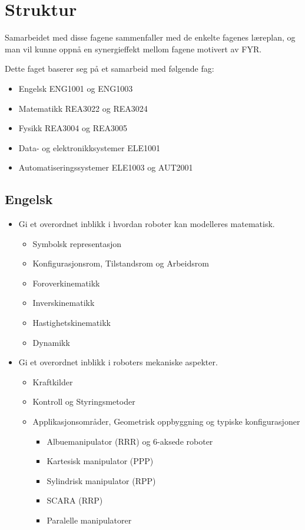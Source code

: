 \section*{Struktur} \label{Sec: Struktur}

	Samarbeidet med disse fagene sammenfaller med de enkelte fagenes læreplan,
	og man vil kunne oppnå en synergieffekt mellom fagene motivert av FYR.

	Dette faget baserer seg på et samarbeid med følgende fag:

	\begin{itemize}
	\item Engelsk ENG1001 og ENG1003
	\item Matematikk REA3022 og REA3024
	\item Fysikk REA3004 og REA3005
	\item Data- og elektronikksystemer ELE1001
	\item Automatiseringssystemer ELE1003 og AUT2001
	\end{itemize}

	\subsection*{Engelsk}

		\begin{itemize}

			\item Gi et overordnet inblikk i hvordan roboter kan modelleres matematisk.
				\begin{itemize}
					\item Symbolsk representasjon
					\item Konfigurasjonsrom, Tilstandsrom og Arbeidsrom
					\item Foroverkinematikk
					\item Inverskinematikk
					\item Hastighetskinematikk
					\item Dynamikk
				\end{itemize}
			\item Gi et overordnet inblikk i roboters mekaniske aspekter.
			\begin{itemize}
				\item Kraftkilder
				\item Kontroll og Styringsmetoder
				\item Applikasjonsområder, Geometrisk oppbyggning og typiske konfigurasjoner
					\begin{itemize}
						\item Albuemanipulator (RRR) og 6-aksede roboter
						\item Kartesisk manipulator (PPP)
						\item Sylindrisk manipulator (RPP)
						\item SCARA (RRP)
						\item Paralelle manipulatorer
					\end{itemize}
			\end{itemize}
		\end{itemize}


